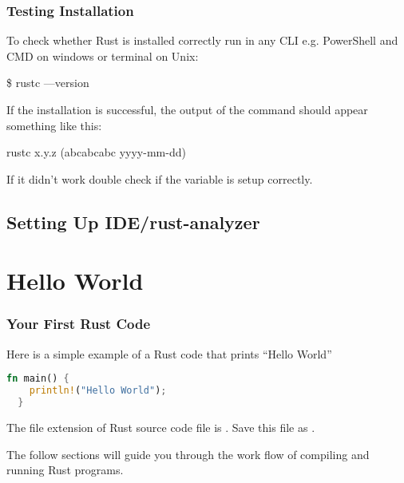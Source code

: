 \documentclass{beamer}
\begin{document}
\begin{frame}[fragile]
  \frametitle{Testing Installation}

  To check whether Rust is installed correctly run in any CLI e.g. PowerShell and CMD on windows or terminal on Unix:
\begin{semiverbatim}
\$ rustc ---version
\end{semiverbatim}

  If the installation is successful, the output of the command should appear something like this:
\begin{semiverbatim}
rustc x.y.z (abcabcabc yyyy-mm-dd)
\end{semiverbatim}

  If it didn't work double check if the  variable is setup correctly.
\end{frame}

\subsection{Setting Up IDE/rust-analyzer}


\section{Hello World}

\begin{frame}[fragile]
  \frametitle{Your First Rust Code}

  Here is a simple example of a Rust code that prints ``Hello World''
\begin{lstlisting}[language=Rust]
  fn main() {
    println!("Hello World");
  }
\end{lstlisting}

  The file extension of Rust source code file is . Save this file as .

  The follow sections will guide you through the work flow of compiling and running Rust programs.
\end{frame}
\end{document}
